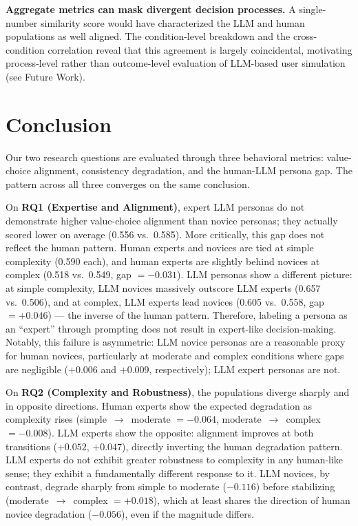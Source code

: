 \documentclass{sigchi-ext}
\begin{document}
\textbf{Aggregate metrics can mask divergent decision processes.}
A single-number similarity score would have characterized the LLM and human populations as well aligned. The condition-level breakdown and the cross-condition correlation reveal that this agreement is largely coincidental, motivating process-level rather than outcome-level evaluation of LLM-based user simulation (see Future Work).

\section{Conclusion}
Our two research questions are evaluated through three behavioral metrics: value-choice alignment, consistency degradation, and the human-LLM persona gap. The pattern across all three converges on the same conclusion.

On \textbf{RQ1 (Expertise and Alignment)}, expert LLM personas do not demonstrate higher value-choice alignment than novice personas; they actually scored lower on average (0.556 vs.\ 0.585). More critically, this gap does not reflect the human pattern. Human experts and novices are tied at simple complexity (0.590 each), and human experts are slightly behind novices at complex (0.518 vs.\ 0.549, gap $= -0.031$). LLM personas show a different picture: at simple complexity, LLM novices massively outscore LLM experts (0.657 vs.\ 0.506), and at complex, LLM experts lead novices (0.605 vs.\ 0.558, gap $= +0.046$) --- the inverse of the human pattern. Therefore, labeling a persona as an ``expert'' through prompting does not result in expert-like decision-making. Notably, this failure is asymmetric: LLM novice personas are a reasonable proxy for human novices, particularly at moderate and complex conditions where gaps are negligible ($+0.006$ and $+0.009$, respectively); LLM expert personas are not.

On \textbf{RQ2 (Complexity and Robustness)}, the populations diverge sharply and in opposite directions. Human experts show the expected degradation as complexity rises (simple~$\rightarrow$~moderate $= -0.064$, moderate~$\rightarrow$~complex $= -0.008$). LLM experts show the opposite: alignment improves at both transitions ($+0.052$, $+0.047$), directly inverting the human degradation pattern. LLM experts do not exhibit greater robustness to complexity in any human-like sense; they exhibit a fundamentally different response to it. LLM novices, by contrast, degrade sharply from simple to moderate ($-0.116$) before stabilizing (moderate~$\rightarrow$~complex $= +0.018$), which at least shares the direction of human novice degradation ($-0.056$), even if the magnitude differs.
\end{document}
